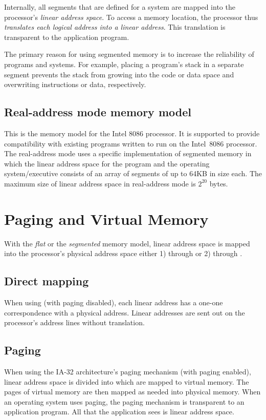 Internally, all segments that are defined for a system are mapped into the
processor's {\em linear address space}. To access a memory location, the
processor thus {\em translates each logical address into a linear
  address\/}. This translation is transparent to the application program. 

The primary reason for using segmented memory is to increase the reliability
of programs and systems. For example, placing a program's stack in a separate
segment prevents the stack from growing into the code or data space and
overwriting instructions or data, respectively. 

\subsection{Real-address mode memory model}
This is the memory model for the Intel 8086 processor. It is supported to
provide compatibility with existing programs written to run on the Intel~8086
processor. The real-address mode uses a specific implementation of segmented
memory in which the linear address space for the program and the operating
system/executive consists of an array of segments of up to 64KB in size
each. The maximum size of linear address space in real-address mode is
$2^{20}$ bytes. 




\section{Paging and Virtual Memory}
With the {\em flat\/} or the {\em segmented\/} memory model, linear address
space is mapped into the processor's physical address space either
1) through  or 2) through . 

\subsection{Direct mapping}
When using  (with paging disabled), each linear address has
a one-one correspondence with a physical address. Linear addresses are sent
out on the processor's address lines without translation. 

\subsection{Paging}
When using the IA-32 architecture's paging mechanism (with paging enabled),
linear address space is divided into  which are mapped to virtual
memory. The pages of virtual memory are then mapped as needed into physical
memory.  When an operating system uses paging, the paging mechanism is
transparent to an application program. All that the application sees is linear
address space. 

